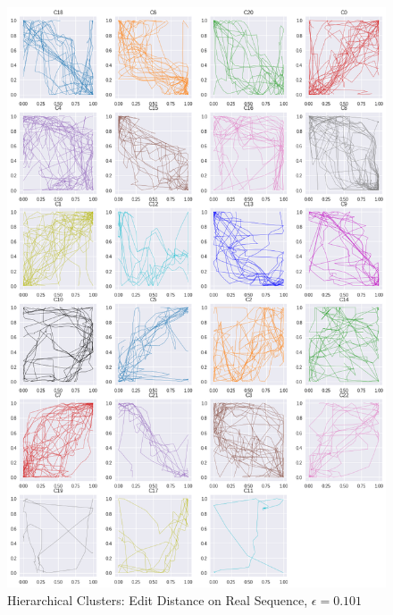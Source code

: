 \begin{figure}[h]
  \centering
  \includegraphics[width=\linewidth,height=\textheight,keepaspectratio]{figs/clusters/CLU_H_ALL[EDR;e=.101].png}
  \caption{ Hierarchical Clusters: Edit Distance on Real Sequence, $\epsilon=0.101$}
\end{figure}

